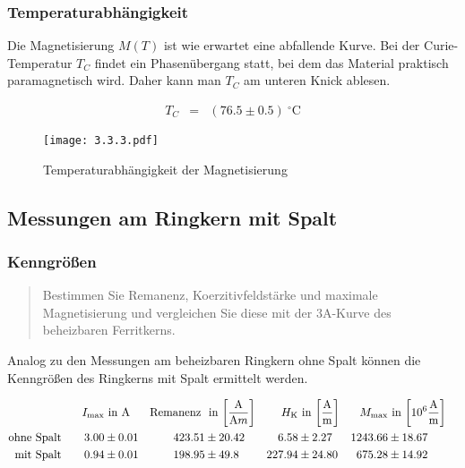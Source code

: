 \documentclass[12pt,a4paper]{scrartcl}
\numberwithin{equation}{section} %
\renewcommand{\[}{} %
\renewcommand{\]}{\noindent} %
\begin{document}
\hypertarget{temperaturabhuxe4ngigkeit-1}{%
\subsubsection{Temperaturabhängigkeit}\label{temperaturabhuxe4ngigkeit-1}}

Die Magnetisierung \(M(T)\) ist wie erwartet eine abfallende Kurve. Bei
der Curie-Temperatur \(T_C\) findet ein Phasenübergang statt, bei dem
das Material praktisch paramagnetisch wird. Daher kann man \(T_C\) am
unteren Knick ablesen.

\[
\begin{eqnarray*}
    T_C &=& (76.5 \pm 0.5) \ ^\circ\mathrm C
\end{eqnarray*}
\]

\begin{figure}
\centering
\texttt{[image: 3.3.3.pdf]}
\caption{Temperaturabhängigkeit der Magnetisierung}
\end{figure}

\hypertarget{messungen-am-ringkern-mit-spalt}{%
\subsection{Messungen am Ringkern mit
Spalt}\label{messungen-am-ringkern-mit-spalt}}

\hypertarget{kenngruxf6uxdfen-1}{%
\subsubsection{Kenngrößen}\label{kenngruxf6uxdfen-1}}

\begin{quote}
Bestimmen Sie Remanenz, Koerzitivfeldstärke und maximale Magnetisierung
und vergleichen Sie diese mit der 3A-Kurve des beheizbaren Ferritkerns.
\end{quote}

Analog zu den Messungen am beheizbaren Ringkern ohne Spalt können die
Kenngrößen des Ringkerns mit Spalt ermittelt werden.

\[
\begin{align*}
    I_\mathrm{max} &\text{ in } \mathrm A &
        \text{Remanenz } &\text{ in }
            {\tiny \left[ \frac{\mathrm A}{\mathrm Am} \right] } &
        H_\mathrm{K} &\text{ in }
            {\tiny \left[ \frac{\mathrm A}{\mathrm m} \right] } &
        M_\mathrm{max} &\text{ in }
            {\tiny \left[10^6 \frac{\mathrm A}{\mathrm m} \right] }
        \\
    \text{ohne Spalt}\qquad
        3.00 &\pm 0.01 &
        423.51 &\pm 20.42 &
        6.58 &\pm 2.27 &
        1243.66 &\pm 18.67
        \\
    \text{mit Spalt}\qquad
        0.94 &\pm 0.01 &
        198.95 &\pm 49.8 &
        227.94 &\pm 24.80 &
        675.28 &\pm 14.92 &
\end{align*}
\]
\end{document}
